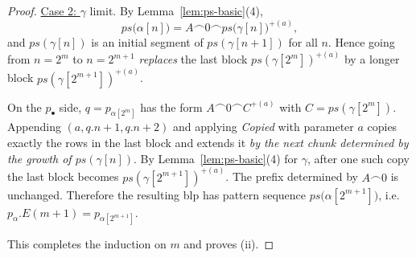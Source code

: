 \documentclass[10pt,a4paper]{amsart}
\begin{document}
\begin{proof}
\underline{Case 2: } $\gamma$ limit.
By Lemma~\ref{lem:ps-basic}(4),
\[
ps\!\bigl(\alpha[n]\bigr)=A\frown 0 \frown ps\!\bigl(\gamma[n]\bigr)^{+(a)},
\]
and $ps(\gamma[n])$ is an initial segment of $ps(\gamma[n+1])$ for all $n$.
Hence going from $n=2^m$ to $n=2^{m+1}$ \emph{replaces} the last block
$ps(\gamma[2^m])^{+(a)}$ by a longer block $ps(\gamma[2^{m+1}])^{+(a)}$.

On the $p_\bullet$ side, $q=p_{\alpha[2^m]}$ has the form
\(
A\frown 0 \frown C^{+(a)}
\)
with $C=ps(\gamma[2^m])$. Appending $(a,q.n+1,q.n+2)$ and applying
\textit{Copied} with parameter $a$ copies exactly the rows in the last block and
extends it \emph{by the next chunk determined by the growth of $ps(\gamma[n])$}.
By Lemma~\ref{lem:ps-basic}(4) for $\gamma$, after one such copy the last block
becomes $ps(\gamma[2^{m+1}])^{+(a)}$. The prefix determined by $A\frown 0$ is
unchanged. Therefore the resulting blp has pattern sequence
$ps\!\bigl(\alpha[2^{m+1}]\bigr)$, i.e.\ $p_\alpha.E(m+1)=p_{\alpha[2^{m+1}]}$.

\smallskip
This completes the induction on $m$ and proves (ii).
\end{proof}
\end{document}
